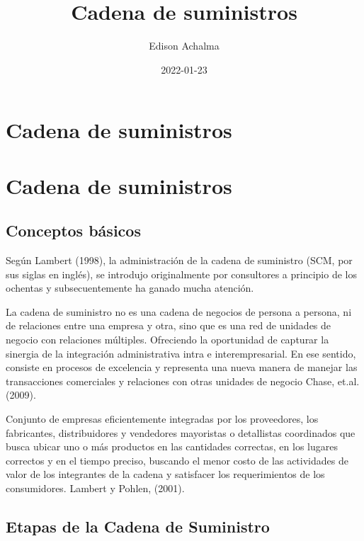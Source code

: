 \documentclass[
  jou,
  floatsintext,
  longtable,
  a4paper,
  nolmodern,
  notxfonts,
  notimes,
  colorlinks=true,linkcolor=blue,citecolor=blue,urlcolor=blue]{apa7}
\title{Cadena de suministros}
\author{Edison Achalma}
\affiliation{
{Escuela Profesional de Economía, Universidad Nacional de San Cristóbal
de Huamanga}}
\date{2022-01-23}
\begin{document}
\maketitle

\hypertarget{toc}{}
\tableofcontents
\newpage
\section[Introduction]{Cadena de suministros}

\setcounter{secnumdepth}{-\maxdimen} %

\setlength\LTleft{0pt}


\section{Cadena de suministros}\label{cadena-de-suministros}

\subsection{Conceptos básicos}\label{conceptos-buxe1sicos}

Según Lambert (1998), la administración de la cadena de suministro (SCM,
por sus siglas en inglés), se introdujo originalmente por consultores a
principio de los ochentas y subsecuentemente ha ganado mucha atención.

La cadena de suministro no es una cadena de negocios de persona a
persona, ni de relaciones entre una empresa y otra, sino que es una red
de unidades de negocio con relaciones múltiples. Ofreciendo la
oportunidad de capturar la sinergia de la integración administrativa
intra e interempresarial. En ese sentido, consiste en procesos de
excelencia y representa una nueva manera de manejar las transacciones
comerciales y relaciones con otras unidades de negocio Chase, et.al.
(2009).

Conjunto de empresas eficientemente integradas por los proveedores, los
fabricantes, distribuidores y vendedores mayoristas o detallistas
coordinados que busca ubicar uno o más productos en las cantidades
correctas, en los lugares correctos y en el tiempo preciso, buscando el
menor costo de las actividades de valor de los integrantes de la cadena
y satisfacer los requerimientos de los consumidores. Lambert y Pohlen,
(2001).

\subsection{Etapas de la Cadena de
Suministro}\label{etapas-de-la-cadena-de-suministro}
\end{document}
